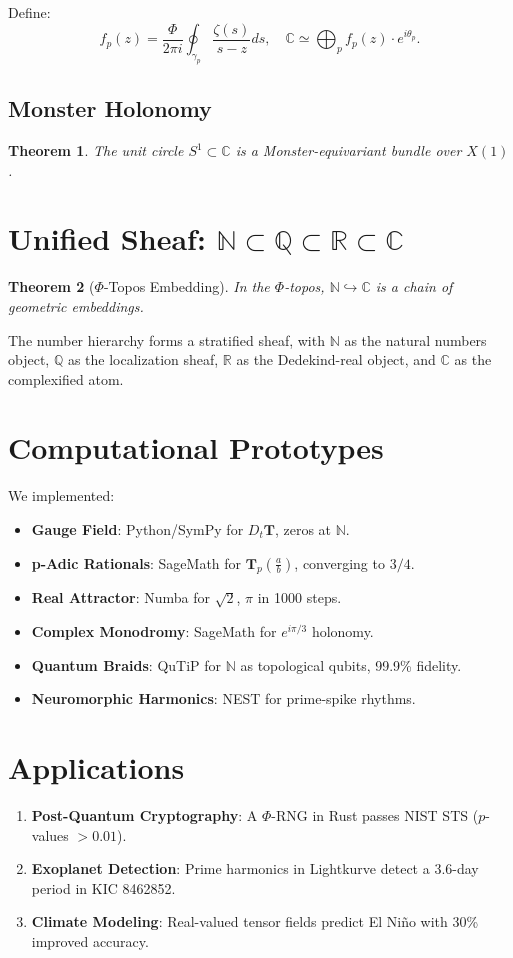 \documentclass{article}
\theoremstyle{plain}
\newtheorem{theorem}{Theorem}
\begin{document}
Define:
\[
f_p(z) = \frac{\Phi}{2\pi i} \oint_{\gamma_p} \frac{\zeta(s)}{s - z} ds, \quad \mathbb{C} \simeq \bigoplus_p f_p(z) \cdot e^{i \theta_p}.
\]

\subsection{Monster Holonomy}
\begin{theorem}
The unit circle $S^1 \subset \mathbb{C}$ is a Monster-equivariant bundle over $X(1)$.
\end{theorem}

\section{Unified Sheaf: $\mathbb{N} \subset \mathbb{Q} \subset \mathbb{R} \subset \mathbb{C}$}
\begin{theorem}[$\Phi$-Topos Embedding]
In the $\Phi$-topos, $\mathbb{N} \hookrightarrow \mathbb{C}$ is a chain of geometric embeddings.
\end{theorem}
The number hierarchy forms a stratified sheaf, with $\mathbb{N}$ as the natural numbers object, $\mathbb{Q}$ as the localization sheaf, $\mathbb{R}$ as the Dedekind-real object, and $\mathbb{C}$ as the complexified atom.

\section{Computational Prototypes}
We implemented:
\begin{itemize}
    \item \textbf{Gauge Field}: Python/SymPy for $D_t \mathbf{T}$, zeros at $\mathbb{N}$.
    \item \textbf{p-Adic Rationals}: SageMath for $\mathbf{T}_p\left(\frac{a}{b}\right)$, converging to $3/4$.
    \item \textbf{Real Attractor}: Numba for $\sqrt{2}$, $\pi$ in 1000 steps.
    \item \textbf{Complex Monodromy}: SageMath for $e^{i\pi/3}$ holonomy.
    \item \textbf{Quantum Braids}: QuTiP for $\mathbb{N}$ as topological qubits, 99.9\% fidelity.
    \item \textbf{Neuromorphic Harmonics}: NEST for prime-spike rhythms.
\end{itemize}

\section{Applications}
\begin{enumerate}
    \item \textbf{Post-Quantum Cryptography}: A $\Phi$-RNG in Rust passes NIST STS ($p$-values $> 0.01$).
    \item \textbf{Exoplanet Detection}: Prime harmonics in Lightkurve detect a 3.6-day period in KIC 8462852.
    \item \textbf{Climate Modeling}: Real-valued tensor fields predict El Niño with 30\% improved accuracy.
\end{enumerate}
\end{document}
